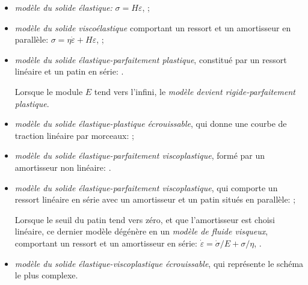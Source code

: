 \begin{itemize}
   \item \emph{modèle du solide élastique:} $\sigma = H \varepsilon$, ;
   \item \emph{modèle du solide viscoélastique} comportant un ressort et un amortisseur en parallèle:
	$\sigma=\eta\dot{\varepsilon}+H\varepsilon$, ;
   \item \emph{modèle du solide élastique-parfaitement plastique}, constitué par un ressort linéaire et 
	un patin en série: .

	Lorsque le module $E$ tend vers l'infini, le \emph{modèle devient rigide-parfaitement plastique}.
   \item \emph{modèle du solide élastique-plastique écrouissable}, qui donne une courbe de traction
	linéaire par morceaux: ;
   \item \emph{modèle du solide élastique-parfaitement viscoplastique}, formé par un amortisseur non linéaire: 
	.
\item \emph{modèle du solide élastique-parfaitement viscoplastique}, qui comporte un ressort linéaire en série 
	avec un amortisseur et un patin situés en parallèle: ;

	Lorsque le seuil du patin tend vers zéro, et que l'amortisseur est choisi linéaire, ce dernier modèle 
	dégénère en un \emph{modèle de fluide visqueux}, comportant un ressort et un amortisseur en série:
	$\dot{\varepsilon}=\dot{\sigma}/E+\sigma/\eta$, .
   \item \emph{modèle du solide élastique-viscoplastique écrouissable}, qui représente le schéma le plus complexe.
\end{itemize}

